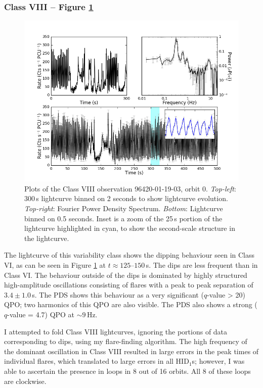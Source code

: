 \subsubsection{Class VIII -- Figure \ref{fig:Omulti}}

\begin{figure}
    \includegraphics[width=0.8\columnwidth, trim = 0.6cm 0 3.9cm 0]{images/Omulti.png}
    \captionsetup{singlelinecheck=off}
    \caption[Characteristic lightcurves and a power spectrum of Type VIII variability.]{Plots of the Class VIII observation 96420-01-19-03, orbit 0.  \textit{Top-left}: 300\,s lightcurve binned on 2 seconds to show lightcurve evolution.  \textit{Top-right}: Fourier Power Density Spectrum.  \textit{Bottom}: Lightcurve binned on 0.5 seconds.  Inset is a zoom of the 25\,s portion of the lightcurve highlighted in cyan, to show the second-scale structure in the lightcurve.}
   \label{fig:Omulti}
\end{figure}

\par The lightcurve of this variability class shows the dipping behaviour seen in Class VI, as can be seen in Figure \ref{fig:Omulti} at $t\approx125$--$150$\,s.  The dips are less frequent than in Class VI.  The behaviour outside of the dips is dominated by highly structured high-amplitude oscillations consisting of flares with a peak to peak separation of $3.4\pm1.0$\,s.  The PDS shows this behaviour as a very significant ($q$-value > 20) QPO; two harmonics of this QPO are also visible.  The PDS also shows a strong ($q$-value = 4.7) QPO at $\sim9$\,Hz.
\par I attempted to fold Class VIII lightcurves, ignoring the portions of data corresponding to dips, using my flare-finding algorithm.  The high frequency of the dominant oscillation in Class VIII resulted in large errors in the peak times of individual flares, which translated to large errors in all HID$_1$s; however, I was able to ascertain the presence in loops in 8 out of 16 orbits.  All 8 of these loops are clockwise.

